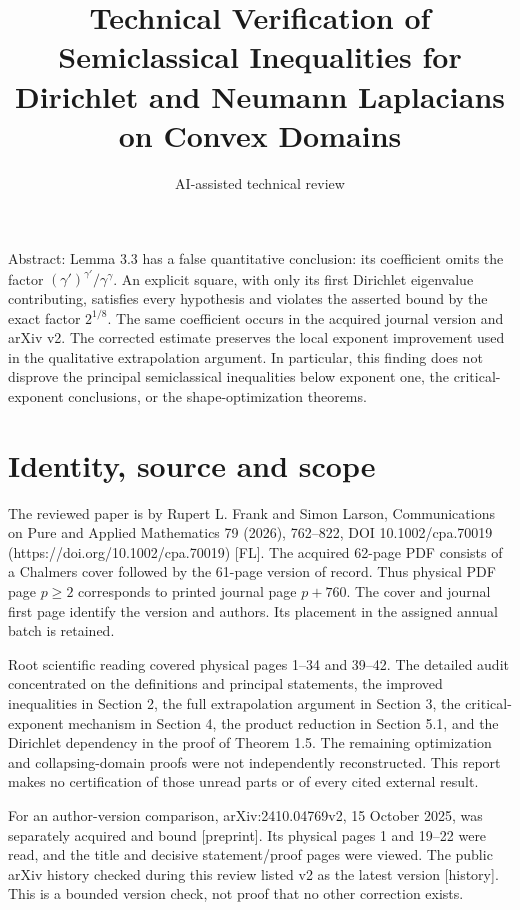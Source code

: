 \documentclass[10pt]{article}
\title{Technical Verification of Semiclassical Inequalities for Dirichlet and Neumann Laplacians on Convex Domains}
\author{AI-assisted technical review}
\date{}
\begin{document}
\maketitle
Abstract: Lemma 3.3 has a false quantitative conclusion: its coefficient omits the factor \((\gamma')^{\gamma'}/\gamma^\gamma\). An explicit square, with only its first Dirichlet eigenvalue contributing, satisfies every hypothesis and violates the asserted bound by the exact factor \(2^{1/8}\). The same coefficient occurs in the acquired journal version and arXiv v2. The corrected estimate preserves the local exponent improvement used in the qualitative extrapolation argument. In particular, this finding does not disprove the principal semiclassical inequalities below exponent one, the critical-exponent conclusions, or the shape-optimization theorems.\par
\section*{Identity, source and scope}
The reviewed paper is by Rupert L. Frank and Simon Larson, Communications on Pure and Applied Mathematics 79 (2026), 762–822, DOI 10.1002/cpa.70019 (https://doi.org/10.1002/cpa.70019) [FL]. The acquired 62-page PDF consists of a Chalmers cover followed by the 61-page version of record. Thus physical PDF page \(p\geq2\) corresponds to printed journal page \(p+760\). The cover and journal first page identify the version and authors. Its placement in the assigned annual batch is retained.\par
Root scientific reading covered physical pages 1–34 and 39–42. The detailed audit concentrated on the definitions and principal statements, the improved inequalities in Section 2, the full extrapolation argument in Section 3, the critical-exponent mechanism in Section 4, the product reduction in Section 5.1, and the Dirichlet dependency in the proof of Theorem 1.5. The remaining optimization and collapsing-domain proofs were not independently reconstructed. This report makes no certification of those unread parts or of every cited external result.\par
For an author-version comparison, arXiv:2410.04769v2, 15 October 2025, was separately acquired and bound [preprint]. Its physical pages 1 and 19–22 were read, and the title and decisive statement/proof pages were viewed. The public arXiv history checked during this review listed v2 as the latest version [history]. This is a bounded version check, not proof that no other correction exists.\par
\end{document}
